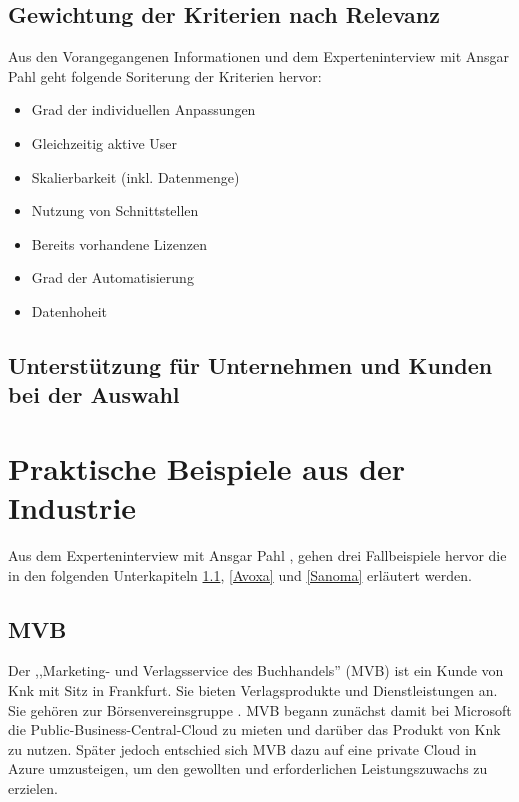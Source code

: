 \documentclass[12pt,bibtotoc]{article}
\begin{document}
		\subsection{Gewichtung der Kriterien nach Relevanz}
		Aus den Vorangegangenen Informationen und dem Experteninterview mit Ansgar Pahl \cite{Anhang} geht folgende Soriterung der Kriterien hervor:
		\begin{itemize}
			\item[1.] Grad der individuellen Anpassungen
			\item[2.] Gleichzeitig aktive User
			\item[3.] Skalierbarkeit (inkl. Datenmenge)
			\item[4.] Nutzung von Schnittstellen
			\item[5.] Bereits vorhandene Lizenzen
			\item[6.] Grad der Automatisierung
			\item[7.] Datenhoheit 
		\end{itemize}
		\subsection{Unterstützung für Unternehmen und Kunden bei der Auswahl}

	\section{Praktische Beispiele aus der Industrie}
		Aus dem Experteninterview mit Ansgar Pahl \cite{Anhang}, gehen drei Fallbeispiele hervor die in den folgenden Unterkapiteln \ref{MVB}, \ref{Avoxa} und \ref{Sanoma} erläutert werden.
			\subsection{MVB}\label{MVB}
			Der ,,Marketing- und Verlagsservice des Buchhandels'' (MVB) ist ein Kunde von Knk mit Sitz in Frankfurt. Sie bieten Verlagsprodukte und Dienstleistungen an. Sie gehören zur Börsenvereinsgruppe \cite{MVB-Website.2024}.\newline 
			MVB begann zunächst damit bei Microsoft die Public-Business-Central-Cloud zu mieten und darüber das Produkt von Knk zu nutzen. Später jedoch entschied sich MVB dazu auf eine private Cloud in Azure umzusteigen, um den gewollten und erforderlichen Leistungszuwachs zu erzielen.
\end{document}
